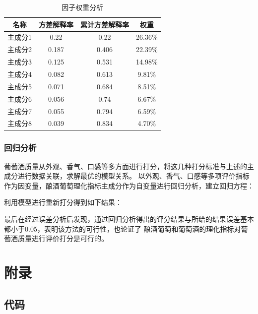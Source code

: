 \documentclass[UTF8]{ctexart}
\begin{document}
\begin{table}[!ht]
	\centering
	\caption{因子权重分析}
	\begin{tabular}{|c|c|c|c|}
		\hline
		名称    & 方差解释率 & 累计方差解释率 & 权重    \\ \hline
		主成分1 & 0.22       & 0.22           & 26.36\% \\ \hline
		主成分2 & 0.187      & 0.406          & 22.39\% \\ \hline
		主成分3 & 0.125      & 0.531          & 14.98\% \\ \hline
		主成分4 & 0.082      & 0.613          & 9.81\%  \\ \hline
		主成分5 & 0.071      & 0.684          & 8.51\%  \\ \hline
		主成分6 & 0.056      & 0.74           & 6.67\%  \\ \hline
		主成分7 & 0.055      & 0.794          & 6.59\%  \\ \hline
		主成分8 & 0.039      & 0.834          & 4.70\%  \\ \hline
	\end{tabular}
\end{table}


\subsubsection{回归分析}
葡萄酒质量从外观、香气、口感等多方面进行打分，将这几种打分标准与上述的主成分进行数据关联，求解最优的模型关系。
以外观、香气、口感等多项评价指标作为因变量，酿酒葡萄理化指标主成分作为自变量进行回归分析，建立回归方程：


利用模型进行重新打分得到如下结果：

最后在经过误差分析后发现，通过回归分析得出的评分结果与所给的结果误差基本都小于0.05，表明该方法的可行性，也论证了
酿酒葡萄和葡萄酒的理化指标对葡萄酒质量进行评价打分是可行的。


\clearpage

\clearpage


\section{附录}
\subsection{代码}
\end{document}
